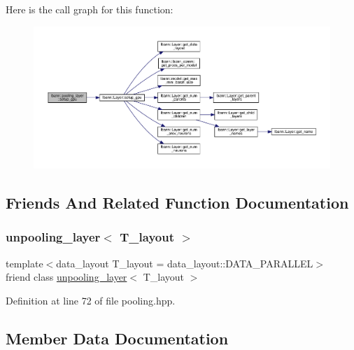Here is the call graph for this function\+:\nopagebreak
\begin{figure}[H]
\begin{center}
\leavevmode
\includegraphics[width=350pt]{classlbann_1_1pooling__layer_a603adc8abc7527f2fd12eb4264b0f3cc_cgraph}
\end{center}
\end{figure}


\subsection{Friends And Related Function Documentation}
\mbox{\label{classlbann_1_1pooling__layer_ad56e2530ee19c632a3a06e6214a1889f}} 
\subsubsection{\texorpdfstring{unpooling\+\_\+layer$<$ T\+\_\+layout $>$}{unpooling\_layer< T\_layout >}}
{\footnotesize\ttfamily template$<$data\+\_\+layout T\+\_\+layout = data\+\_\+layout\+::\+D\+A\+T\+A\+\_\+\+P\+A\+R\+A\+L\+L\+EL$>$ \\
friend class \hyperlink{classlbann_1_1unpooling__layer}{unpooling\+\_\+layer}$<$ T\+\_\+layout $>$\hspace{0.3cm}{\ttfamily [friend]}}



Definition at line 72 of file pooling.\+hpp.



\subsection{Member Data Documentation}
\mbox{\label{classlbann_1_1pooling__layer_a58683798db4c48175cbad5ec32ff676c}} 
